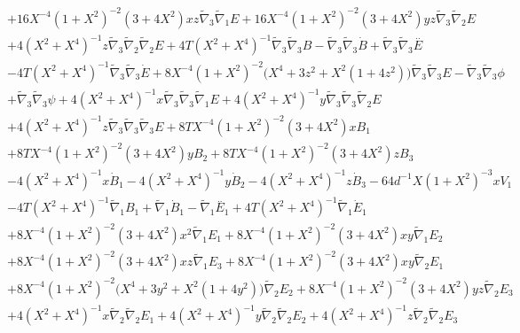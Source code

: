 \documentclass[10pt,letterpaper]{article}
\numberwithin{equation}{section}
\begin{document}
\begin{appendices}
\begin{eqnarray}
&& + 16 X^{-4} (1 + X^2)^{-2} (3 + 4 X^2) x z \tilde{\nabla}_{3}\tilde{\nabla}_{1}E + 16 X^{-4} (1 + X^2)^{-2} (3 + 4 X^2) y z \tilde{\nabla}_{3}\tilde{\nabla}_{2}E \nonumber \\ 
&& + 4 (X^2 + X^4)^{-1} z \tilde{\nabla}_{3}\tilde{\nabla}_{2}\tilde{\nabla}_{2}E + 4 T (X^2 + X^4)^{-1} \tilde{\nabla}_{3}\tilde{\nabla}_{3}B -  \tilde{\nabla}_{3}\tilde{\nabla}_{3}\dot{B} + \tilde{\nabla}_{3}\tilde{\nabla}_{3}\overset{..}{E} \nonumber \\ 
&& - 4 T (X^2 + X^4)^{-1} \tilde{\nabla}_{3}\tilde{\nabla}_{3}\dot{E} + 8 X^{-4} (1 + X^2)^{-2} \bigl(X^4 + 3 z^2 + X^2 (1 + 4 z^2)\bigr) \tilde{\nabla}_{3}\tilde{\nabla}_{3}E -  \tilde{\nabla}_{3}\tilde{\nabla}_{3}\phi \nonumber \\ 
&& + \tilde{\nabla}_{3}\tilde{\nabla}_{3}\psi + 4 (X^2 + X^4)^{-1} x \tilde{\nabla}_{3}\tilde{\nabla}_{3}\tilde{\nabla}_{1}E + 4 (X^2 + X^4)^{-1} y \tilde{\nabla}_{3}\tilde{\nabla}_{3}\tilde{\nabla}_{2}E \nonumber \\ 
&& + 4 (X^2 + X^4)^{-1} z \tilde{\nabla}_{3}\tilde{\nabla}_{3}\tilde{\nabla}_{3}E+8 T X^{-4} (1 + X^2)^{-2} (3 + 4 X^2) x B_{1} \nonumber \\ 
&& + 8 T X^{-4} (1 + X^2)^{-2} (3 + 4 X^2) y B_{2} + 8 T X^{-4} (1 + X^2)^{-2} (3 + 4 X^2) z B_{3} \nonumber \\ 
&& - 4 (X^2 + X^4)^{-1} x \dot{B}_{1} - 4 (X^2 + X^4)^{-1} y \dot{B}_{2} - 4 (X^2 + X^4)^{-1} z \dot{B}_{3} - 64 d^{-1} X (1 + X^2)^{-3} x V_{1} \nonumber \\ 
&& - 4 T (X^2 + X^4)^{-1} \tilde{\nabla}_{1}B_{1} + \tilde{\nabla}_{1}\dot{B}_{1} -  \tilde{\nabla}_{1}\overset{..}{E}_{1} + 4 T (X^2 + X^4)^{-1} \tilde{\nabla}_{1}\dot{E}_{1} \nonumber \\ 
&& + 8 X^{-4} (1 + X^2)^{-2} (3 + 4 X^2) x^2 \tilde{\nabla}_{1}E_{1} + 8 X^{-4} (1 + X^2)^{-2} (3 + 4 X^2) x y \tilde{\nabla}_{1}E_{2} \nonumber \\ 
&& + 8 X^{-4} (1 + X^2)^{-2} (3 + 4 X^2) x z \tilde{\nabla}_{1}E_{3} + 8 X^{-4} (1 + X^2)^{-2} (3 + 4 X^2) x y \tilde{\nabla}_{2}E_{1} \nonumber \\ 
&& + 8 X^{-4} (1 + X^2)^{-2} \bigl(X^4 + 3 y^2 + X^2 (1 + 4 y^2)\bigr) \tilde{\nabla}_{2}E_{2} + 8 X^{-4} (1 + X^2)^{-2} (3 + 4 X^2) y z \tilde{\nabla}_{2}E_{3} \nonumber \\ 
&& + 4 (X^2 + X^4)^{-1} x \tilde{\nabla}_{2}\tilde{\nabla}_{2}E_{1} + 4 (X^2 + X^4)^{-1} y \tilde{\nabla}_{2}\tilde{\nabla}_{2}E_{2} + 4 (X^2 + X^4)^{-1} z \tilde{\nabla}_{2}\tilde{\nabla}_{2}E_{3} \nonumber \\ 

\end{eqnarray}
\end{appendices}
\end{document}
